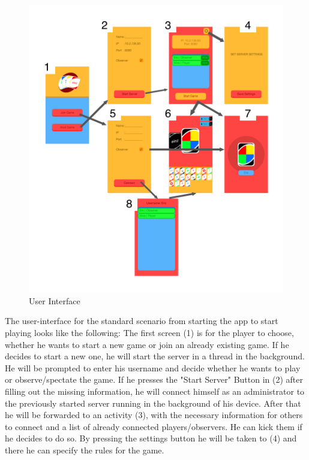 \documentclass{report}
\newcommand{\lfig}[1]{\label{fig:#1}}
\begin{document}
\begin{figure}[h]
	\centering
    \includegraphics[width=\columnwidth]{Artboard.png}
    \vspace{-5mm} %
	\caption{User Interface}
	\lfig{artboard}
\end{figure}

The user-interface for the standard scenario from starting the app to start playing looks like the following: The first screen (1) is for the player to choose, whether he wants to start a new game or join an already existing game. If he decides to start a new one, he will start the server in a thread in the background. He will be prompted to enter his username and decide whether he wants to play or observe/spectate the game. If he presses the "Start Server" Button in (2) after filling out the missing information, he will connect himself as an administrator to the previously started server running in the background of his device. After that he will be forwarded to an activity (3), with the necessary information for others to connect and a list of already connected players/observers. He can kick them if he decides to do so. By pressing the settings button he will be taken to (4) and there he can specify the rules for the game.
\end{document}
